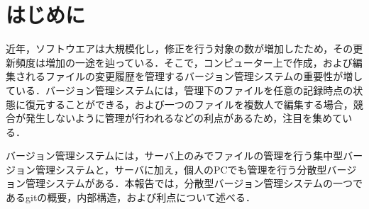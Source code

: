 \documentclass[a4j,9pt,twocolumn]{jsarticle}
\begin{document}


\section{はじめに}
近年，ソフトウエアは大規模化し，修正を行う対象の数が増加したため，その更新頻度は増加の一途を辿っている．そこで，コンピューター上で作成，および編集されるファイルの変更履歴を管理するバージョン管理システムの重要性が増している．バージョン管理システムには，管理下のファイルを任意の記録時点の状態に復元することができる，および一つのファイルを複数人で編集する場合，競合が発生しないように管理が行われるなどの利点があるため，注目を集めている\cite{pop}．

バージョン管理システムには，サーバ上のみでファイルの管理を行う集中型バージョン管理システムと，サーバに加え，個人のPCでも管理を行う分散型バージョン管理システムがある．本報告では，分散型バージョン管理システムの一つであるgitの概要，内部構造，および利点について述べる．
\end{document}
